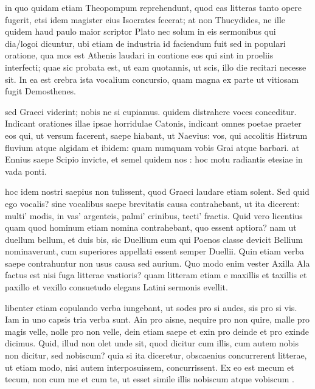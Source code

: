  in quo quidam etiam Theopompum reprehendunt, quod eas litteras tanto opere fugerit, etsi idem magister eius Isocrates fecerat; at non Thucydides, ne ille quidem haud paulo maior scriptor Plato nec solum in eis sermonibus qui dia/logoi dicuntur, ubi etiam de industria id faciendum fuit sed in populari oratione, qua mos est Athenis laudari in contione eos qui sint in proeliis interfecti; quae sic probata est, ut eam quotannis, ut scis, illo die recitari necesse sit. In ea est crebra ista vocalium concursio, quam magna ex parte ut vitiosam fugit Demosthenes.

 sed Graeci viderint; nobis ne si cupiamus. quidem distrahere voces conceditur. Indicant orationes illae ipsae horridulae Catonis, indicant omnes poetae praeter eos qui, ut versum facerent, saepe hiabant, ut Naevius: vos, qui accolitis Histrum fluvium atque algidam et ibidem: quam numquam vobis Grai atque barbari. at Ennius saepe Scipio invicte, et semel quidem nos : hoc motu radiantis etesiae in vada ponti.

 hoc idem nostri saepius non tulissent, quod Graeci laudare etiam solent. Sed quid ego vocalis? sine vocalibus saepe brevitatis causa contrahebant, ut ita dicerent: multi' modis, in vas' argenteis, palmi' crinibus, tecti' fractis. Quid vero licentius quam quod hominum etiam nomina contrahebant, quo essent aptiora? nam ut duellum bellum, et duis bis, sic Duellium eum qui Poenos classe devicit Bellium nominaverunt, cum superiores appellati essent semper Duellii. Quin etiam verba saepe contrahuntur non usus causa sed aurium. Quo modo enim vester Axilla Ala factus est nisi fuga litterae vastioris? quam litteram etiam e maxillis et taxillis et paxillo et vexillo consuetudo elegans Latini sermonis evellit.

 libenter etiam copulando verba iungebant, ut sodes pro si audes, sis pro si vis. Iam in uno capsis tria verba sunt. Ain pro aisne, nequire pro non quire, malle pro magis velle, nolle pro non velle, dein etiam saepe et exin pro deinde et pro exinde dicimus. Quid, illud non olet unde sit, quod dicitur cum illis, cum autem nobis non dicitur, sed nobiscum? quia si ita diceretur, obscaenius concurrerent litterae, ut etiam modo, nisi autem interposuissem, concurrissent. Ex eo est mecum et tecum, non cum me et cum te, ut esset simile illis nobiscum atque vobiscum .

